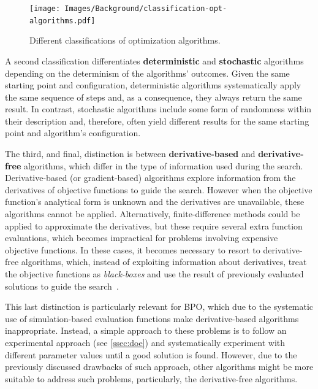 	\begin{figure}
		\centering
		\texttt{[image: Images/Background/classification-opt-algorithms.pdf]}
		\caption{Different classifications of optimization algorithms.}
		\label{fig:optALGOclassification}
	\end{figure}
	
	A second classification differentiates \textbf{deterministic} and \textbf{stochastic} algorithms depending on the determinism of the algorithms' outcomes. Given the same starting point and configuration, deterministic algorithms systematically apply the same sequence of steps and, as a consequence, they always return the same result. In contrast, stochastic algorithms include some form of randomness within their description and, therefore, often yield different results for the same starting point and algorithm's configuration.
		
	The third, and final, distinction is between \textbf{derivative-based} and \textbf{derivative-free} algorithms, which differ in the type of information used during the search. Derivative-based (or gradient-based) algorithms explore information from the derivatives of objective functions to guide the search. %
	However when the objective function's analytical form is unknown and the derivatives are unavailable, these algorithms cannot be applied. Alternatively, finite-difference methods could be applied to approximate the derivatives, but these require several extra function evaluations, which becomes impractical for problems involving expensive objective functions. In these cases, it becomes necessary to resort to derivative-free algorithms, which, instead of exploiting information about derivatives, treat the objective functions as \textit{black-boxes} and use the result of previously evaluated solutions to guide the search~\cite{Rios2013}.
	
	This last distinction is particularly relevant for \ac{BPO}, which due to the systematic use of simulation-based evaluation functions make derivative-based algorithms inappropriate. Instead, a simple approach to these problems is to follow an experimental approach (see \cref{ssec:doe}) and systematically experiment with different parameter values until a good solution is found. However, due to the previously discussed drawbacks of such approach, other algorithms might be more suitable to address such problems, particularly, the derivative-free algorithms.
		
